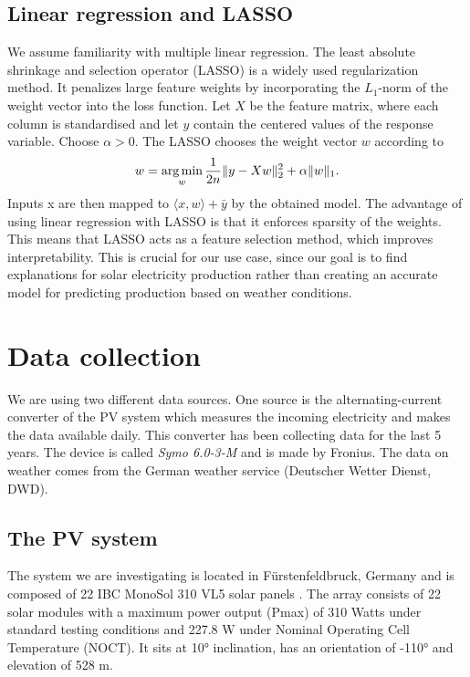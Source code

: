 \documentclass{article}
\begin{document}
\subsection{Linear regression and LASSO}
We assume familiarity with multiple linear regression. The least absolute shrinkage and selection operator (LASSO) is a widely used regularization method. It penalizes large feature weights by incorporating the $L_1$-norm of the weight vector into the loss function. Let $X$ be the feature matrix, where each column is standardised and let $y$ contain the centered values of the response variable. Choose $\alpha > 0$. The LASSO chooses the weight vector $w$ according to
\begin{equation*}
	w = \underset{w}{\text{arg\,min}} \, \frac{1}{2n} \|y - Xw\|_2^2 + \alpha \|w\|_1.
\end{equation*}
Inputs x are then mapped to $\langle x, w \rangle + \bar{y}$ by the obtained model. The advantage of using linear regression with LASSO is that it enforces sparsity of the weights. This means that LASSO acts as a feature selection method, which improves interpretability. This is crucial for our use case, since our goal is to find explanations for solar electricity production rather than creating an accurate model for predicting production based on weather conditions.


\section{Data collection}
We are using two different data sources. One source is the alternating-current converter of the PV system which measures the incoming electricity and makes the data available daily.
This converter has been collecting data for the last 5 years. The device is called \textit{Symo 6.0-3-M} and is made by Fronius.
The data on weather comes from the German weather service (Deutscher Wetter Dienst, DWD).
\subsection{The PV system}
The system we are investigating is located in Fürstenfeldbruck, Germany and is composed of 22 IBC MonoSol 310 VL5 solar panels \cite{MonoSol}.
The array consists of 22 solar modules with a maximum power output (Pmax) of 310 Watts under standard testing conditions and 227.8 W  under Nominal Operating Cell Temperature (NOCT).
It sits at 10° inclination, has an orientation of -110° and elevation of 528 m.
\end{document}
